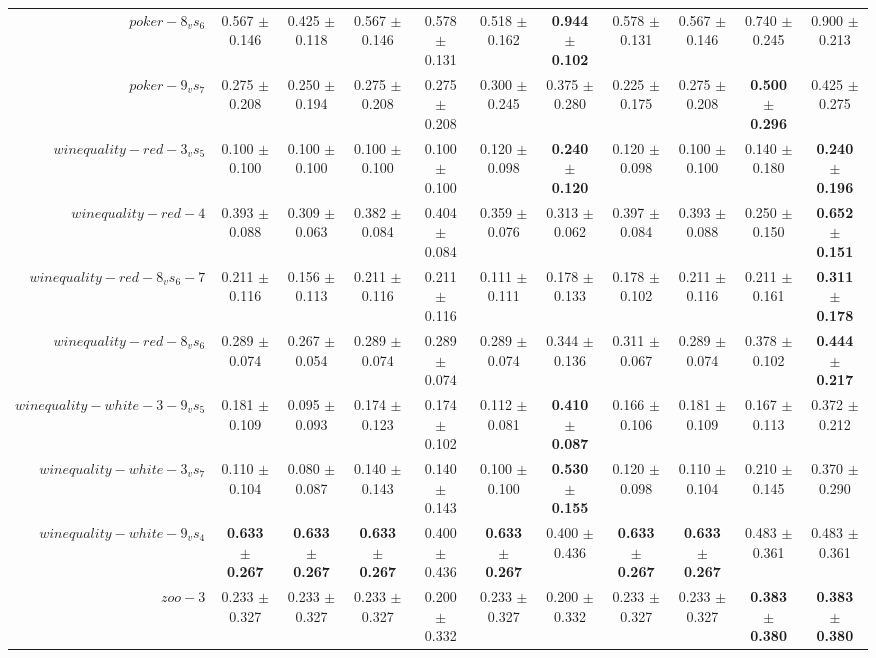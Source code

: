 \begin{table}[!ht]
{\begin{tabular}{r c c c c c c c c c c}
$poker-8_vs_6$ & 0.567 $\pm$ 0.146 & 0.425 $\pm$ 0.118 & 0.567 $\pm$ 0.146 & 0.578 $\pm$ 0.131 & 0.518 $\pm$ 0.162 & \textbf{0.944 $\pm$ 0.102} & 0.578 $\pm$ 0.131 & 0.567 $\pm$ 0.146 & 0.740 $\pm$ 0.245 & 0.900 $\pm$ 0.213 \\
$poker-9_vs_7$ & 0.275 $\pm$ 0.208 & 0.250 $\pm$ 0.194 & 0.275 $\pm$ 0.208 & 0.275 $\pm$ 0.208 & 0.300 $\pm$ 0.245 & 0.375 $\pm$ 0.280 & 0.225 $\pm$ 0.175 & 0.275 $\pm$ 0.208 & \textbf{0.500 $\pm$ 0.296} & 0.425 $\pm$ 0.275 \\
$winequality-red-3_vs_5$ & 0.100 $\pm$ 0.100 & 0.100 $\pm$ 0.100 & 0.100 $\pm$ 0.100 & 0.100 $\pm$ 0.100 & 0.120 $\pm$ 0.098 & \textbf{0.240 $\pm$ 0.120} & 0.120 $\pm$ 0.098 & 0.100 $\pm$ 0.100 & 0.140 $\pm$ 0.180 & \textbf{0.240 $\pm$ 0.196} \\
$winequality-red-4$ & 0.393 $\pm$ 0.088 & 0.309 $\pm$ 0.063 & 0.382 $\pm$ 0.084 & 0.404 $\pm$ 0.084 & 0.359 $\pm$ 0.076 & 0.313 $\pm$ 0.062 & 0.397 $\pm$ 0.084 & 0.393 $\pm$ 0.088 & 0.250 $\pm$ 0.150 & \textbf{0.652 $\pm$ 0.151} \\
$winequality-red-8_vs_6-7$ & 0.211 $\pm$ 0.116 & 0.156 $\pm$ 0.113 & 0.211 $\pm$ 0.116 & 0.211 $\pm$ 0.116 & 0.111 $\pm$ 0.111 & 0.178 $\pm$ 0.133 & 0.178 $\pm$ 0.102 & 0.211 $\pm$ 0.116 & 0.211 $\pm$ 0.161 & \textbf{0.311 $\pm$ 0.178} \\
$winequality-red-8_vs_6$ & 0.289 $\pm$ 0.074 & 0.267 $\pm$ 0.054 & 0.289 $\pm$ 0.074 & 0.289 $\pm$ 0.074 & 0.289 $\pm$ 0.074 & 0.344 $\pm$ 0.136 & 0.311 $\pm$ 0.067 & 0.289 $\pm$ 0.074 & 0.378 $\pm$ 0.102 & \textbf{0.444 $\pm$ 0.217} \\
$winequality-white-3-9_vs_5$ & 0.181 $\pm$ 0.109 & 0.095 $\pm$ 0.093 & 0.174 $\pm$ 0.123 & 0.174 $\pm$ 0.102 & 0.112 $\pm$ 0.081 & \textbf{0.410 $\pm$ 0.087} & 0.166 $\pm$ 0.106 & 0.181 $\pm$ 0.109 & 0.167 $\pm$ 0.113 & 0.372 $\pm$ 0.212 \\
$winequality-white-3_vs_7$ & 0.110 $\pm$ 0.104 & 0.080 $\pm$ 0.087 & 0.140 $\pm$ 0.143 & 0.140 $\pm$ 0.143 & 0.100 $\pm$ 0.100 & \textbf{0.530 $\pm$ 0.155} & 0.120 $\pm$ 0.098 & 0.110 $\pm$ 0.104 & 0.210 $\pm$ 0.145 & 0.370 $\pm$ 0.290 \\
$winequality-white-9_vs_4$ & \textbf{0.633 $\pm$ 0.267} & \textbf{0.633 $\pm$ 0.267} & \textbf{0.633 $\pm$ 0.267} & 0.400 $\pm$ 0.436 & \textbf{0.633 $\pm$ 0.267} & 0.400 $\pm$ 0.436 & \textbf{0.633 $\pm$ 0.267} & \textbf{0.633 $\pm$ 0.267} & 0.483 $\pm$ 0.361 & 0.483 $\pm$ 0.361 \\
$zoo-3$ & 0.233 $\pm$ 0.327 & 0.233 $\pm$ 0.327 & 0.233 $\pm$ 0.327 & 0.200 $\pm$ 0.332 & 0.233 $\pm$ 0.327 & 0.200 $\pm$ 0.332 & 0.233 $\pm$ 0.327 & 0.233 $\pm$ 0.327 & \textbf{0.383 $\pm$ 0.380} & \textbf{0.383 $\pm$ 0.380} \\

\end{tabular}}
\end{table}
